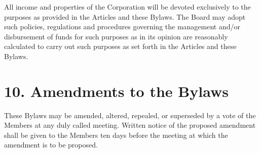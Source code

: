 \documentclass[
]{book}
\begin{document}
All income and properties of the Corporation will be devoted exclusively to the purposes as provided in the Articles and these Bylaws. The Board may adopt such policies, regulations and procedures governing the management and/or disbursement of funds for such purposes as in its opinion are reasonably calculated to carry out such purposes as set forth in the Articles and these Bylaws.

\section{10. Amendments to the Bylaws}\label{amendments-to-the-bylaws}

These Bylaws may be amended, altered, repealed, or superseded by a vote
of the Members at any duly called meeting. Written notice of the
proposed amendment shall be given to the Members ten days before the
meeting at which the amendment is to be proposed.
\end{document}
